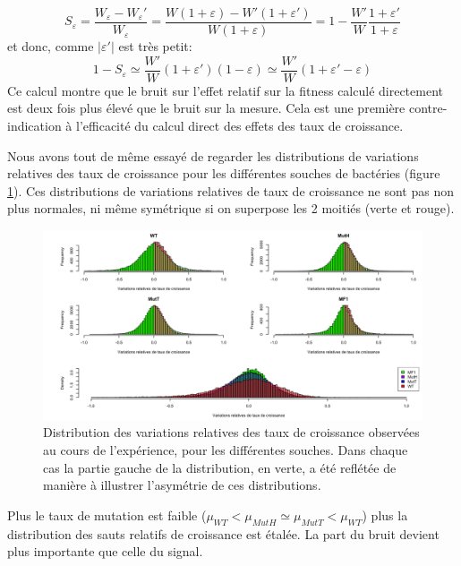 \documentclass[12pt]{article}
\newcommand{\abs}[1]{\left|#1\right|}
\begin{document}
\[S_\varepsilon=\frac{W_\varepsilon - W_\varepsilon'}{W_\varepsilon} 
= \frac{W(1+\varepsilon) - W'(1+\varepsilon')}{W(1+\varepsilon)}
= 1 - \frac{W'}{W}\frac{1+\varepsilon'}{1+\varepsilon}\]
et donc, comme $\abs{\varepsilon'}$ est très petit:
\[1 - S_\varepsilon \simeq \frac{W'}{W}(1+\varepsilon')(1-\varepsilon)\simeq \frac{W'}{W}(1+\varepsilon'-\varepsilon)\]
Ce calcul montre que le bruit sur l'effet relatif sur la fitness calculé directement est deux fois plus élevé que le bruit sur la mesure. Cela est une première contre-indication à l'efficacité du calcul direct des effets des taux de croissance.

Nous avons tout de même essayé de regarder les distributions de variations relatives des taux de croissance pour les différentes souches de bactéries (figure \ref{fig:VarRel}). Ces distributions de variations relatives de taux de croissance ne sont pas non plus normales, ni même symétrique si on superpose les 2 moitiés (verte et rouge).

\begin{figure}[!h]
  \begin{center}
    \vspace{3mm}
    \includegraphics[scale=0.3]{../Img/Variations_relatives_GR.png}
  \end{center} 
  \caption{\label{fig:VarRel}Distribution des variations relatives des taux de croissance observées au cours de l'expérience, pour les différentes souches. Dans chaque cas la partie gauche de la distribution, en verte, a été reflétée de manière à illustrer l'asymétrie de ces distributions.}
\end{figure}

Plus le taux de mutation est faible ($\mu_{WT} < \mu_{MutH} \simeq \mu_{MutT} < \mu_{WT}$) plus la distribution des sauts relatifs de croissance est étalée. La part du bruit devient plus importante que celle du signal.
\end{document}
